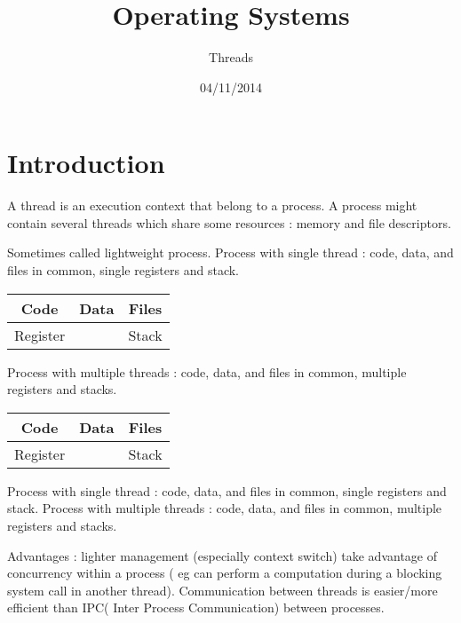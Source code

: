 \documentclass[a4paper,10pt]{article}
\title{Operating Systems}
\subtitle{Threads}
\author{}
\date{04/11/2014}
\begin{document}
\maketitle


\section{Introduction}

A thread is an execution context that belong to a process.
A process might contain several threads which share some resources : memory and file descriptors.

Sometimes called lightweight process.
Process with single thread : code, data, and files in common, single registers and stack. 
\begin{center}
\begin{tabular}{|ccc|}
\hline
	Code & Data & Files\\
	\hline
	Register & & Stack\\
	\hline
\end{tabular}

\end{center}
Process with multiple threads : code, data, and files in common, multiple registers and stacks.

\begin{center}
\begin{tabular}{|ccc|}
\hline
	Code & Data & Files\\
	\hline
	Register & & Stack\\
	\hline
\end{tabular}

\end{center}
Process with single thread : code, data, and files in common, single registers and stack.
Process with multiple threads : code, data, and files in common, multiple registers and stacks.

Advantages :
lighter management (especially context switch)
take advantage of concurrency within a process ( eg can perform a computation during a blocking system call in another thread).
Communication between threads is easier/more efficient than IPC( Inter Process Communication) between processes.





 
\end{document}
